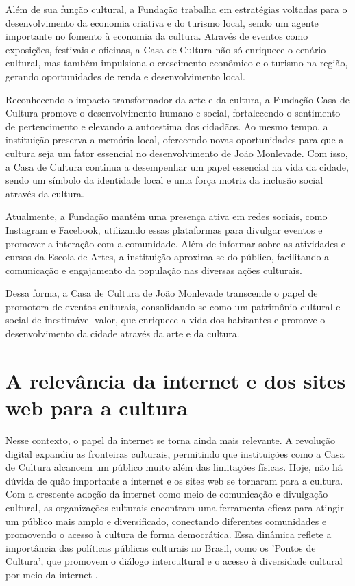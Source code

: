 Além de sua função cultural, a Fundação trabalha em estratégias voltadas para o desenvolvimento da economia criativa e do turismo local, sendo um agente importante no fomento à economia da cultura. Através de eventos como exposições, festivais e oficinas, a Casa de Cultura não só enriquece o cenário cultural, mas também impulsiona o crescimento econômico e o turismo na região, gerando oportunidades de renda e desenvolvimento local.

Reconhecendo o impacto transformador da arte e da cultura, a Fundação Casa de Cultura promove o desenvolvimento humano e social, fortalecendo o sentimento de pertencimento e elevando a autoestima dos cidadãos. Ao mesmo tempo, a instituição preserva a memória local, oferecendo novas oportunidades para que a cultura seja um fator essencial no desenvolvimento de João Monlevade. Com isso, a Casa de Cultura continua a desempenhar um papel essencial na vida da cidade, sendo um símbolo da identidade local e uma força motriz da inclusão social através da cultura.

Atualmente, a Fundação mantém uma presença ativa em redes sociais, como Instagram e Facebook, utilizando essas plataformas para divulgar eventos e promover a interação com a comunidade. Além de informar sobre as atividades e cursos da Escola de Artes, a instituição aproxima-se do público, facilitando a comunicação e engajamento da população nas diversas ações culturais.

Dessa forma, a Casa de Cultura de João Monlevade transcende o papel de promotora de eventos culturais, consolidando-se como um patrimônio cultural e social de inestimável valor, que enriquece a vida dos habitantes e promove o desenvolvimento da cidade através da arte e da cultura.


\section{A relevância da internet e dos sites web para a cultura}

Nesse contexto, o papel da internet se torna ainda mais relevante. A revolução digital expandiu as fronteiras culturais, permitindo que instituições como a Casa de Cultura alcancem um público muito além das limitações físicas. Hoje, não há dúvida de quão importante a internet e os sites web se tornaram para a cultura. Com a crescente adoção da internet como meio de comunicação e divulgação cultural, as organizações culturais encontram uma ferramenta eficaz para atingir um público mais amplo e diversificado, conectando diferentes comunidades e promovendo o acesso à cultura de forma democrática. Essa dinâmica reflete a importância das políticas públicas culturais no Brasil, como os 'Pontos de Cultura', que promovem o diálogo intercultural e o acesso à diversidade cultural por meio da internet \cite{costa2011}.

